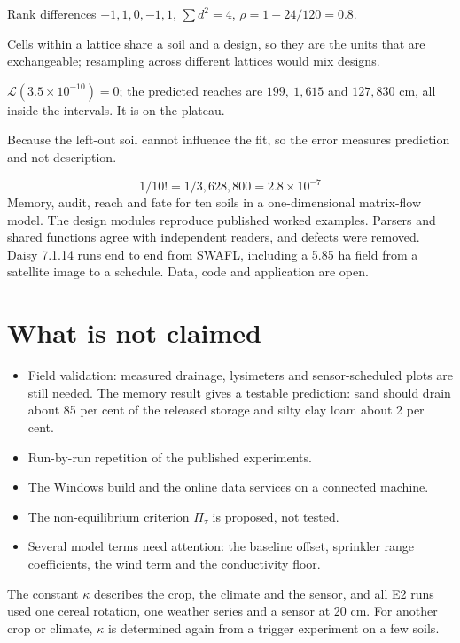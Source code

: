 \sol  Rank differences $-1,1,0,-1,1$, $\sum d^2=4$, $\rho=1-24/120=0.8$. \finans

\sol  Cells within a lattice share a soil and a design, so they are the units that are exchangeable; resampling across different lattices would mix designs. \finans

\sol {}\ans $\mathcal L(3.5\times10^{-10})=0$; the predicted reaches are $199,\ 1{,}615$ and $127{,}830$ cm, all inside the intervals. It is on the plateau. \finans

\sol  Because the left-out soil cannot influence the fit, so the error measures prediction and not description. \finans

\sol {}\ans \[1/10!=1/3{,}628{,}800=2.8\times10^{-7}\]
Memory, audit, reach and fate for ten soils in a one-dimensional matrix-flow model. The design modules reproduce published worked examples. Parsers and shared functions agree with independent readers, and defects were removed. Daisy 7.1.14 runs end to end from SWAFL, including a 5.85 ha field from a satellite image to a schedule. Data, code and application are open. \finans

\section{What is not claimed}
\begin{itemize}[leftmargin=*]
\item Field validation: measured drainage, lysimeters and sensor-scheduled plots are still needed. The memory result gives a testable prediction: sand should drain about 85 per cent of the released storage and silty clay loam about 2 per cent.
\item Run-by-run repetition of the published experiments.
\item The Windows build and the online data services on a connected machine.
\item The non-equilibrium criterion $\Pi_\tau$ is proposed, not tested.
\item Several model terms need attention: the baseline offset, sprinkler range coefficients, the wind term and the conductivity floor.
\end{itemize}
The constant $\kappa$ describes the crop, the climate and the sensor, and all E2 runs used one cereal rotation, one weather series and a sensor at 20 cm. For another crop or climate, $\kappa$ is determined again from a trigger experiment on a few soils.

